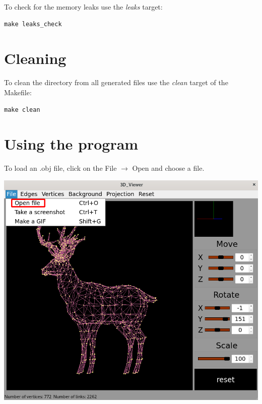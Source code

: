 \documentclass[a4paper, 12pt]{article}
\begin{document}
To check for the memory leaks use the \textit{leaks} target:
\begin{verbatim}
make leaks_check
\end{verbatim}

\section{Cleaning}

To clean the directory from all generated files use the \textit{clean} target of the Makefile:
\begin{verbatim}
make clean
\end{verbatim}

\newpage
\section{Using the program}

\large To load an .obj file, click on the File $\rightarrow$ Open and choose a file.
\begin{center}
  \includegraphics[width=1\textwidth]{images/open_file.png}
\end{center}
\end{document}
